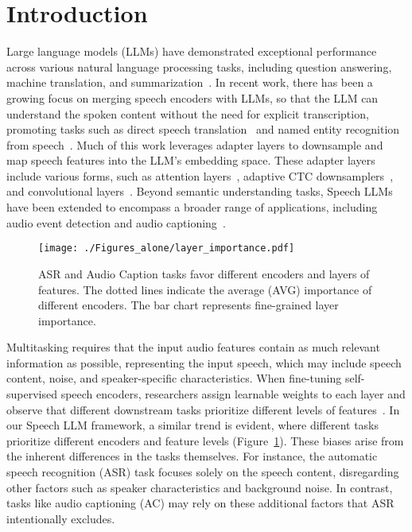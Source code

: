 \section{Introduction}

Large language models (LLMs) have demonstrated exceptional performance across various natural language processing tasks, including question answering, machine translation, and summarization~\cite{gpt2023gpt}. In recent work, there has been a growing focus on merging speech encoders with LLMs, so that the LLM can understand the spoken content without the need for explicit transcription, promoting tasks such as direct speech translation~\cite{chen2023salm} and named entity recognition from speech~\cite{li2024usinglargelanguagemodel}. Much of this work leverages adapter layers to downsample and map speech features into the LLM’s embedding space. These adapter layers include various forms, such as attention layers~\cite{yu2023connecting}, adaptive CTC downsamplers~\cite{ling2023adapting}, and convolutional layers~\cite{fathullah2023prompting}. Beyond semantic understanding tasks, Speech LLMs have been extended to encompass a broader range of applications, including audio event detection and audio captioning~\cite{Qwen2-Audio}. 

\begin{figure}[tp]
  \centering
  \centerline{\texttt{[image: ./Figures\_alone/layer\_importance.pdf]}}  
  \caption{ASR and Audio Caption tasks favor different encoders and layers of features. The dotted lines indicate the average (AVG) importance of different encoders. The bar chart represents fine-grained layer importance.}
\label{fig:layer_importance}
\end{figure}

Multitasking requires that the input audio features contain as much relevant information as possible, representing the input speech, which may include speech content, noise, and speaker-specific characteristics. When fine-tuning self-supervised speech encoders, researchers assign learnable weights to each layer and observe that different downstream tasks prioritize different levels of features~\cite{chen2021wavlm}. In our Speech LLM framework, a similar trend is evident, where different tasks prioritize different encoders and feature levels (Figure~\ref{fig:layer_importance}). These biases arise from the inherent differences in the tasks themselves. For instance, the automatic speech recognition (ASR) task focuses solely on the speech content, disregarding other factors such as speaker characteristics and background noise. In contrast, tasks like audio captioning (AC) may rely on these additional factors that ASR intentionally excludes.

